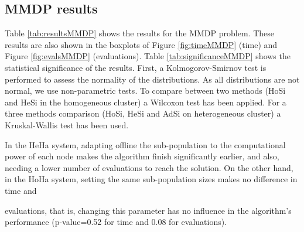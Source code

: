 \documentclass[final,1p,times]{elsarticle}
\begin{document}
\subsection{MMDP results}

Table \ref{tab:resultsMMDP} shows the results for the MMDP problem. These results are also shown in the boxplots of Figure \ref{fig:timeMMDP} (time) and Figure \ref{fig:evalsMMDP} (evaluations). Table \ref{tab:significanceMMDP} shows the statistical significance of the results. First, a Kolmogorov-Smirnov test is performed to assess the normality of the distributions. As all distributions are not normal, we use non-parametric tests. To compare between two methods (HoSi and HeSi in the homogeneous cluster) a Wilcoxon test has been applied. For a three methods comparison (HoSi, HeSi and AdSi on heterogeneous cluster) a Kruskal-Wallis test has been used. %

 In the HeHa system, adapting offline the sub-population to the computational
 power of each node makes the algorithm finish significantly earlier,
 and also, needing a lower number of evaluations to reach the solution. On the other hand, in the HoHa system,
 setting the same sub-population sizes makes no difference in time and

 evaluations, that is, changing this parameter has no influence in the
 algorithm's performance (p-value=0.52 for time and 0.08 for evaluations).
\end{document}
